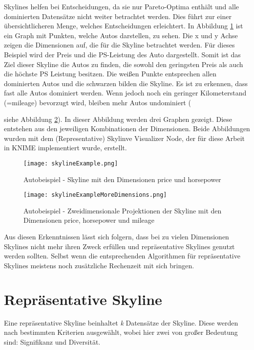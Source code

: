 Skylines helfen bei Entscheidungen, da sie nur Pareto-Optima enthält und alle dominierten Datensätze nicht weiter betrachtet werden. Dies führt zur einer übersichtlicheren Menge, welches Entscheidungen erleichtert.
In Abbildung \ref{img:skylineExample} ist ein Graph mit Punkten, welche Autos darstellen, zu sehen. Die x und y Achse zeigen die Dimensionen auf, die für die Skyline betrachtet werden. Für dieses Beispiel wird der Preis und die PS-Leistung des Auto dargestellt. Somit ist das Ziel dieser Skyline die Autos zu finden, die sowohl den geringsten Preis als auch die höchste PS Leistung besitzen.
Die weißen Punkte entsprechen allen dominierten Autos und die schwarzen bilden die Skyline. Es ist zu erkennen, dass fast alle Autos dominiert werden. Wenn jedoch noch ein geringer Kilometerstand (=mileage) bevorzugt wird, bleiben mehr Autos undominiert ({siehe Abbildung \ref{img:skylineExampleMoreDimensions}). In dieser Abbildung werden drei Graphen gezeigt. Diese entstehen aus den jeweiligen Kombinationen der Dimensionen. Beide Abbildungen wurden mit dem (Representative) Skylinve Visualizer Node, der für diese Arbeit in KNIME implementiert wurde, erstellt.

\begin{figure}[H]
	\centering
	\texttt{[image: skylineExample.png]}
	\caption{Autobeispiel - Skyline mit den Dimensionen price und horsepower}
	\label{img:skylineExample}
\end{figure}


\begin{figure}[H]
	\centering
    \texttt{[image: skylineExampleMoreDimensions.png]}
	\caption{Autobeispiel - Zweidimensionale Projektionen der Skyline mit den Dimensionen price, horsepower und mileage}
	\label{img:skylineExampleMoreDimensions}
\end{figure}

Aus diesen Erkenntnissen lässt sich folgern, dass bei zu vielen Dimensionen Skylines nicht mehr ihren Zweck erfüllen und repräsentative Skylines genutzt werden sollten. Selbst wenn die entsprechenden Algorithmen für repräsentative Skylines meistens noch zusätzliche Rechenzeit mit sich bringen.
\section{Repräsentative Skyline}
\label{ch:Grundlagen:sec:repSkyline}
Eine repräsentative Skyline beinhaltet \textit{k} Datensätze der Skyline. Diese werden nach bestimmten Kriterien ausgewählt, wobei hier zwei von großer Bedeutung sind: Signifikanz und Diversität.

}
